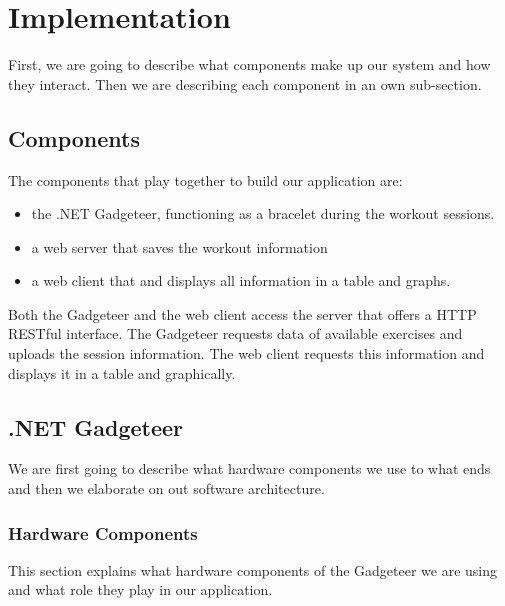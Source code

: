 \documentclass{tk3-team}
\begin{document}

\section{Implementation}

First, we are going to describe what components make up our system and how they interact. Then we are describing each component in an own sub-section.

\subsection{Components}
The components that play together to build our application are:
\begin{itemize}
	\item the .NET Gadgeteer, functioning as a bracelet during the workout sessions.
	\item a web server that saves the workout information 
	\item  a web client that and displays all information in a table and graphs.
\end{itemize}

Both the Gadgeteer and the web client access the server that offers a HTTP RESTful interface. The Gadgeteer requests data of available exercises  and uploads the session information. The web client requests this information and displays it in a table and graphically.

\subsection{.NET Gadgeteer}

We are first going to describe what hardware components we use to what ends and then we elaborate on out software architecture.

\subsubsection{Hardware Components}

This section explains what hardware components of the Gadgeteer we are using and what role they play in our application.
\end{document}
